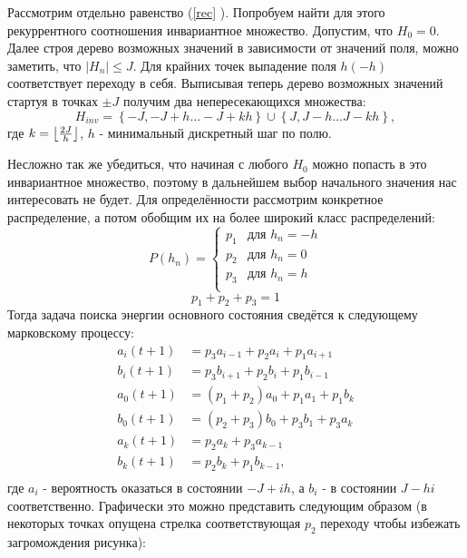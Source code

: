	Рассмотрим отдельно равенство (\ref{rec} ). Попробуем найти для этого рекуррентного соотношения инвариантное множество. Допустим, что $H_0=0$. Далее строя дерево возможных значений в зависимости от значений поля, можно заметить, что $|H_{n}| \leq J$. Для крайних точек выпадение поля $h (-h)$ соответствует переходу в себя.
	Выписывая теперь дерево возможных значений стартуя в точках $\pm J$ получим два непересекающихся множества:
	 \begin{equation}
		H_{inv} = \left\{ -J, -J + h \dots -J + kh \right\} \cup \left\{ J, J - h  \dots J - kh \right\},
	\end{equation}
	где $k = \floor*{ \frac{2J}{h}}$, $h$ - минимальный дискретный шаг по полю.

	Несложно так же убедиться, что начиная с любого $H_0$ можно попасть в это инвариантное множество, поэтому в дальнейшем выбор начального значения нас интересовать не будет.
	Для определённости рассмотрим конкретное распределение, а потом обобщим их на более широкий класс распределений:
\begin{equation*}
P(h_n) =
\begin{cases}
p_1 &\mbox{для } h_n= -h \\
p_2 &\mbox{для } h_n= 0 \\
p_3 &\mbox{для } h_n= h\\
\end{cases}
\end{equation*}
\begin{equation*}
p_1+p_2+p_3 = 1
\end{equation*}
Тогда задача поиска энергии основного состояния сведётся к следующему марковскому процессу:
\begin{align*}
a_i(t+1) &= p_3 a_{i-1} + p_2 a_i + p_1 a_{i+1}\\
b_i(t+1)&= p_3 b_{i+1} + p_2 b_i + p_1 b_{i-1}\\
a_0(t+1)&= (p_1 + p_2) a_0 + p_1 a_1 + p_1 b_k\\
b_0(t+1) &= (p_2 + p_3) b_0 + p_3 b_1 + p_3 a_k \\
a_k(t+1) &= p_2 a_k + p_3 a_{k-1}\\
b_k(t+1) &= p_2 b_k + p_1 b_{k-1},\\
\end{align*}
где $a_i$ - вероятность оказаться в состоянии $-J+ih$, а $b_i$ - в состоянии $J-hi$ соответственно.
Графически это можно представить следующим образом (в некоторых точках опущена стрелка соответствующая $p_2$ переходу чтобы избежать загромождения рисунка):

